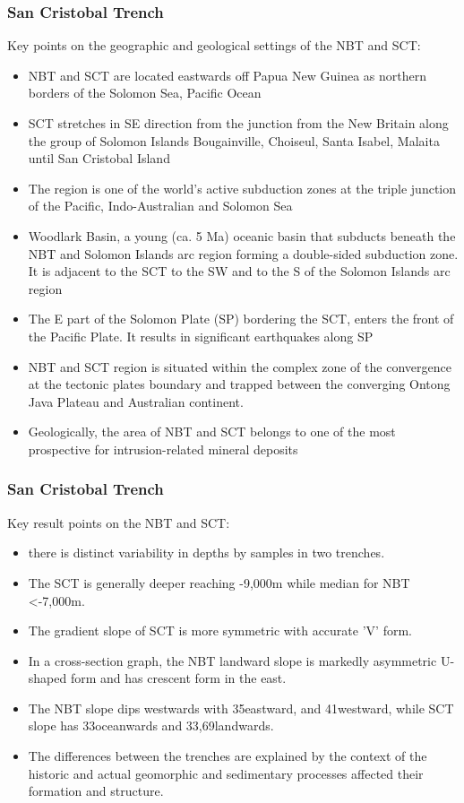 \documentclass[pdflatex,compress,8pt,
	xcolor={dvipsnames,dvipsnames,svgnames,x11names,table},
	hyperref={colorlinks = true,breaklinks = true, urlcolor = NavyBlue, breaklinks = true}]{beamer}
\begin{document}
\begin{frame}\frametitle{San Cristobal Trench}
Key points on the geographic and geological settings of the NBT and SCT: 
\begin{itemize}
             \item NBT and SCT are located eastwards off Papua New Guinea as northern borders of the Solomon Sea, Pacific Ocean
             \item SCT stretches in SE direction from the junction from the New Britain along the group of Solomon Islands Bougainville, Choiseul, Santa Isabel, Malaita until San Cristobal Island
              \item The region is one of the world’s active subduction zones at the triple junction of the Pacific, Indo-Australian and Solomon Sea 
              \item Woodlark Basin, a young (ca. 5 Ma) oceanic basin that subducts beneath the NBT and  Solomon Islands arc region forming a double-sided subduction zone. It is adjacent to the SCT to the SW and to the S of the Solomon Islands arc region
            \item The E part of the Solomon Plate (SP) bordering the SCT, enters the front of the Pacific Plate. It results in significant earthquakes along SP
            \item NBT and SCT region is situated within the complex zone of the convergence at the tectonic plates boundary and trapped between the converging Ontong Java Plateau and Australian continent.
            \item Geologically, the area of NBT and SCT belongs to one of the most prospective for intrusion-related mineral deposits
\end{itemize}	

\end{frame}

\begin{frame}\frametitle{San Cristobal Trench}
Key result points on the NBT and SCT: 
\begin{itemize}
            \item there is distinct variability in depths by samples in two trenches. 
            \item The SCT is generally deeper reaching -9,000m while median for NBT <-7,000m. 
            \item The gradient slope of SCT is more symmetric with accurate 'V' form.
            \item In a cross-section graph, the NBT landward slope is markedly asymmetric U-shaped form and has crescent form in the east.
            \item The NBT slope dips westwards with 35\degree eastward, and 41\degree westward, while SCT slope has 33\degree oceanwards and 33,69\degree landwards.
            \item  The differences between the trenches are explained by the context of the historic and actual geomorphic and sedimentary processes affected their formation and structure. 

\end{itemize}	

\end{frame}
\end{document}
